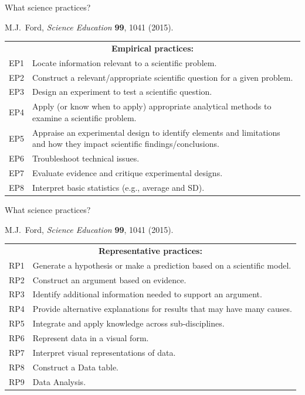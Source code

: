 \documentclass[xcolor=dvipsnames,table]{beamer}
\begin{document}
\begin{frame}{What science practices?}
  \begin{block}{M.J.\ Ford, \textit{Science Education} \textbf{99}, 1041 (2015).}
    \begin{tabular}{lp{4in}} 
      \multicolumn{2}{c}{\textbf{Empirical practices:}} \\
      EP1 &Locate information relevant to a scientific problem.\\
      EP2 &Construct a relevant/appropriate scientific question for a given problem.\\
      EP3 &Design an experiment to test a scientific question.\\
      EP4 &Apply (or know when to apply) appropriate analytical methods to examine a
            scientific problem.\\
      EP5 &Appraise an experimental design to identify elements and limitations and how they
            impact scientific findings/conclusions.\\
      EP6 &Troubleshoot technical issues.\\
      EP7 &Evaluate evidence and critique experimental designs.\\
      EP8 &Interpret basic statistics (e.g., average and SD).\\
    \end{tabular}
  \end{block}
\end{frame}

\begin{frame}{What science practices?}
  \begin{block}{M.J.\ Ford, \textit{Science Education} \textbf{99}, 1041 (2015).}
    \begin{tabular}{lp{4in}} 
      \multicolumn{2}{c}{ \textbf{Representative practices:}} \\
      RP1 &Generate a hypothesis or make a prediction based on a scientific model. \\
      RP2 &Construct an argument based on evidence.\\
      RP3 &Identify additional information needed to support an argument.\\
      RP4 &Provide alternative explanations for results that may have many causes.\\
      RP5 &Integrate and apply knowledge across sub-disciplines.\\
      RP6 &Represent data in a visual form.\\
      RP7 &Interpret visual representations of data.\\
      RP8 &Construct a Data table.\\
      RP9 &Data Analysis.\\
    \end{tabular}
  \end{block}
\end{frame}
\end{document}
